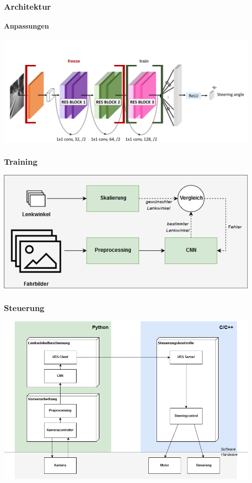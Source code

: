 \documentclass{beamer}
\begin{document}
\begin{frame}
\frametitle{Architektur}
\framesubtitle{Anpassungen}
\includegraphics[width=\linewidth]{figures/Architecture-DRONET-FROZEN.png}	
\end{frame}

\begin{frame}
\frametitle{Training}
\includegraphics[width=\linewidth]{figures/Lernarchitektur.png}	 
\end{frame}

\begin{frame}
\frametitle{Steuerung}
\includegraphics[width=\linewidth]{figures/Steuerung.png}	 

\end{frame}
\end{document}
